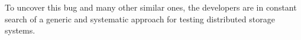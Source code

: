 To uncover this bug and many other similar ones, the developers are in constant search of a generic and systematic approach for testing distributed storage systems.

